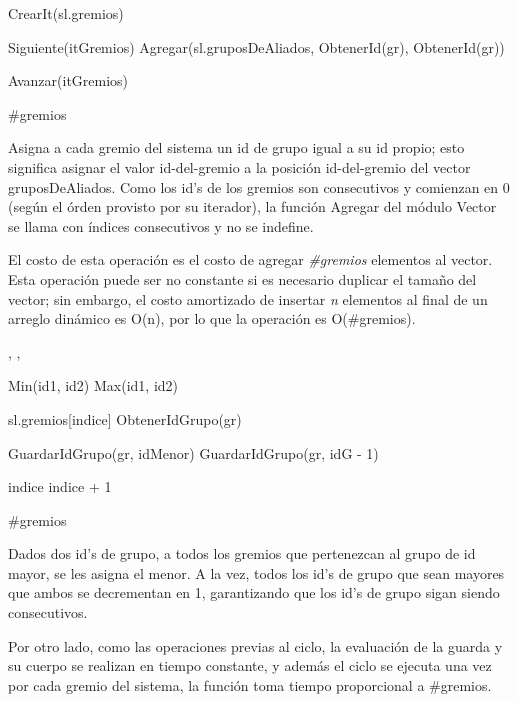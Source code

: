{
	\state {} \asig CrearIt(sl.gremios)		
											
		\state
		
		\state {} \asig Siguiente(itGremios)							
		\state Agregar(sl.gruposDeAliados, ObtenerId(gr), ObtenerId(gr))	

		\state
		\state Avanzar(itGremios)											
	\endwhile
}
{ \#gremios }
{ Asigna a cada gremio del sistema un id de grupo igual a su id propio; esto significa asignar el valor id-del-gremio a la posici\'on id-del-gremio del vector gruposDeAliados. Como los id's de los gremios son consecutivos y comienzan en 0 (seg\'un el \'orden provisto por su iterador), la funci\'on Agregar del m\'odulo Vector se llama con \'indices consecutivos y no se indefine.

\hspace{10pt} El costo de esta operaci\'on es el costo de agregar \emph{\#gremios} elementos al vector. Esta operaci\'on puede ser no constante si es necesario duplicar el tamaño del vector; sin embargo, el costo amortizado de insertar \emph{n} elementos al final de un arreglo din\'amico es O(n), por lo que la operaci\'on es O(\#gremios). }

{, , }{}
{
	\state {} \asig Min(id1, id2)						
	\state {} \asig Max(id1, id2)						
	\state

	\state {} 										

									
		\state

		\state {} \asig sl.gremios[indice]					
		\state {} \asig ObtenerIdGrupo(gr)		
		\state

														
			\state GuardarIdGrupo(gr, idMenor)								
		\Else {}										
				\state GuardarIdGrupo(gr, idG - 1)							
			\endif
		\endif
		\state

		\state indice \asig indice + 1										
	\endwhile
}
{\#gremios}
{ Dados dos id's de grupo, a todos los gremios que pertenezcan al grupo de id mayor, se les asigna el menor. A la vez, todos los id's de grupo que sean mayores que ambos se decrementan en 1, garantizando que los id's de grupo sigan siendo consecutivos.

\hspace{10pt} Por otro lado, como las operaciones previas al ciclo, la evaluaci\'on de la guarda y su cuerpo se realizan en tiempo constante, y adem\'as el ciclo se ejecuta una vez por cada gremio del sistema, la funci\'on toma tiempo proporcional a \#gremios. }

